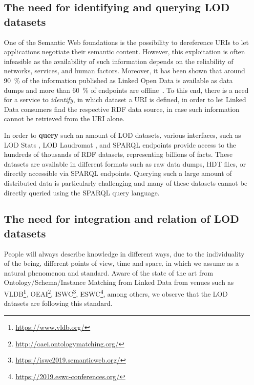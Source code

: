 \documentclass[sw]{iosart2x}
\begin{document}

\subsection{The need for identifying and querying LOD datasets}
One of the Semantic Web foundations is the possibility to dereference URIs to let applications negotiate their semantic content.
However, this exploitation is often infeasible as the availability of such information depends on the reliability of networks, services, and human factors.
Moreover, it has been shown that around \SI{90}{\percent} of the information published as Linked Open Data is available as data dumps and more than \SI{60}{\percent} of endpoints are offline~\cite{hogan2016linked}.
To this end, there is a need for a service to \textit{identify}, in which dataset a URI is defined, in order to let Linked Data consumers find the respective RDF data source, in case such information cannot be retrieved from the URI alone.

In order to \textbf{query} such an amount of LOD datasets, various interfaces, such as LOD Stats \cite{auer2012lodstats}, LOD Laudromat \cite{beek2014lod}, and SPARQL endpoints provide access to the hundreds of thousands of RDF datasets, representing billions of facts.
These datasets are available in different formats such as raw data dumps, HDT files, or directly accessible via SPARQL endpoints.
Querying such a large amount of distributed data is particularly challenging and many of these datasets cannot be directly queried using the SPARQL query language. %

\subsection{The need for integration and relation of LOD datasets}

People will always describe knowledge in different ways, due to the individuality of the being, different points of view, time and space, in which we assume as a natural phenomenon and standard.
Aware of the state of the art from Ontology/Schema/Instance Matching from Linked Data from venues such as VLDB\footnote{\url{https://www.vldb.org/}}, OEAI\footnote{\url{http://oaei.ontologymatching.org/}}, ISWC\footnote{\url{https://iswc2019.semanticweb.org/}}, ESWC\footnote{\url{https://2019.eswc-conferences.org/}}, among others, we observe that the LOD datasets are following this standard.
\end{document}
